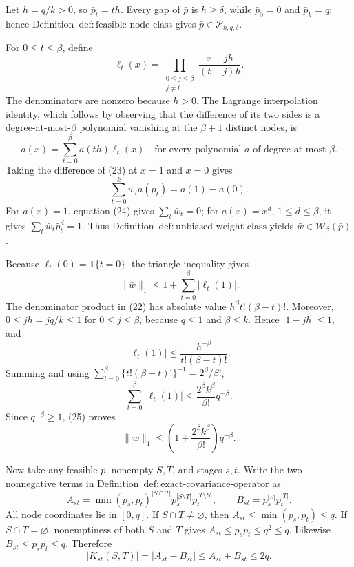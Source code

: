 Let \(h=q/k>0\), so \(\bar p_t=th\).  Every gap of \(\bar p\) is \(h\ge\delta\), while \(\bar p_0=0\) and \(\bar p_k=q\); hence Definition~\(\mathrm{def{:}feasible\text{-}node\text{-}class}\) gives \(\bar p\in\mathcal P_{k,q,\delta}\).

For \(0\le t\le\beta\), define
\[
\ell_t(x)=\prod_{\substack{0\le j\le\beta\\j\ne t}}
\frac{x-jh}{(t-j)h}.
\tag{22}
\]
The denominators are nonzero because \(h>0\).  The Lagrange interpolation identity, which follows by observing that the difference of its two sides is a degree-at-most-\(\beta\) polynomial vanishing at the \(\beta+1\) distinct nodes, is
\[
a(x)=\sum_{t=0}^\beta a(th)\ell_t(x)
\quad\text{for every polynomial \(a\) of degree at most \(\beta\)}.
\tag{23}
\]
Taking the difference of (23) at \(x=1\) and \(x=0\) gives
\[
\sum_{t=0}^k\bar w_ta(\bar p_t)=a(1)-a(0).
\tag{24}
\]
For \(a(x)=1\), equation (24) gives \(\sum_t\bar w_t=0\); for \(a(x)=x^d\), \(1\le d\le\beta\), it gives \(\sum_t\bar w_t\bar p_t^d=1\).  Thus Definition~\(\mathrm{def{:}unbiased\text{-}weight\text{-}class}\) yields \(\bar w\in\mathcal W_\beta(\bar p)\).

Because \(\ell_t(0)=\mathbf 1\{t=0\}\), the triangle inequality gives
\[
\|\bar w\|_1
\le1+\sum_{t=0}^\beta|\ell_t(1)|.
\tag{25}
\]
The denominator product in (22) has absolute value \(h^\beta t!(\beta-t)!\).  Moreover, \(0\le jh=jq/k\le1\) for \(0\le j\le\beta\), because \(q\le1\) and \(\beta\le k\).  Hence \(|1-jh|\le1\), and
\[
|\ell_t(1)|
\le\frac{h^{-\beta}}{t!(\beta-t)!}.
\]
Summing and using \(\sum_{t=0}^\beta\{t!(\beta-t)!\}^{-1}=2^\beta/\beta!\),
\[
\sum_{t=0}^\beta|\ell_t(1)|
\le\frac{2^\beta k^\beta}{\beta!}q^{-\beta}.
\]
Since \(q^{-\beta}\ge1\), (25) proves
\[
\|\bar w\|_1
\le\left(1+\frac{2^\beta k^\beta}{\beta!}\right)q^{-\beta}.
\tag{26}
\]

Now take any feasible \(p\), nonempty \(S,T\), and stages \(s,t\).  Write the two nonnegative terms in Definition~\(\mathrm{def{:}exact\text{-}covariance\text{-}operator}\) as
\[
A_{st}=\min(p_s,p_t)^{|S\cap T|}p_s^{|S\setminus T|}p_t^{|T\setminus S|},
\qquad
B_{st}=p_s^{|S|}p_t^{|T|}.
\]
All node coordinates lie in \([0,q]\).  If \(S\cap T\ne\varnothing\), then \(A_{st}\le\min(p_s,p_t)\le q\).  If \(S\cap T=\varnothing\), nonemptiness of both \(S\) and \(T\) gives \(A_{st}\le p_sp_t\le q^2\le q\).  Likewise \(B_{st}\le p_sp_t\le q\).  Therefore
\[
|K_{st}(S,T)|=|A_{st}-B_{st}|
\le A_{st}+B_{st}\le2q.
\tag{27}
\]

